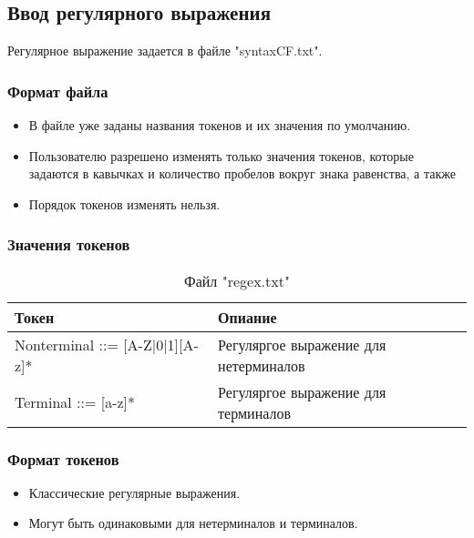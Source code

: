 \documentclass[12pt]{article}
\begin{document}
    \clearpage


    \subsection{Ввод регулярного выражения}

    Регулярное выражение задается в файле "syntaxCF.txt".

    \subsubsection*{Формат файла}
    \begin{itemize}
        \item В файле уже заданы названия токенов и их значения по умолчанию.
        \item Пользователю разрешено изменять только значения токенов, которые задаются в кавычках и количество пробелов вокруг знака равенства, а также
        \item Порядок токенов изменять нельзя.
    \end{itemize}

    \subsubsection*{Значения токенов}
    \begin{table}[hbt!]
        \centering
        \begin{tabular}{|l|l|}
            \hline
            Токен & Опиание \\
            \hline
            Nonterminal ::= [A-Z|0|1][A-z]* & Регуляргое выражение для нетерминалов\\
            Terminal ::= [a-z]* & Регуляргое выражение для терминалов\\
            \hline
        \end{tabular}
        \caption{Файл "regex.txt"}
    \end{table}

    \subsubsection*{Формат токенов}
    \begin{itemize}
        \item Классические регулярные выражения.
        \item Могут быть одинаковыми для нетерминалов и терминалов.
    \end{itemize}
\end{document}
